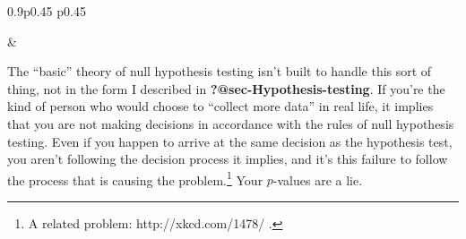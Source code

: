 \documentclass[
  a4paper,
]{book}
\begin{document}
\begin{table}[ht]
\begin{centerbox}
\begin{threeparttable}
\begin{tabularx}{0.9\textwidth}{p{} p{}}
\hhline{}

 &
 \tabularnewline[-0.5pt]


\end{tabularx} 

\end{threeparttable}\par\end{centerbox}

\end{table}
 

The ``basic'' theory of null hypothesis testing isn't built to handle
this sort of thing, not in the form I described in
\textbf{?@sec-Hypothesis-testing}. If you're the kind of person who
would choose to ``collect more data'' in real life, it implies that you
are not making decisions in accordance with the rules of null hypothesis
testing. Even if you happen to arrive at the same decision as the
hypothesis test, you aren't following the decision process it implies,
and it's this failure to follow the process that is causing the
problem.\footnote{A related problem: http://xkcd.com/1478/ .} Your
\(p\)-values are a lie.
\end{document}
